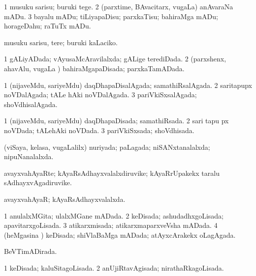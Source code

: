 \bentry
{} 
\gl{\sakirx}
\expl{}
\bmng
\bnum
\num{1} musuku sarisu; buruki tege. 
\num{2} (parxtime, BAvacitarx, \mo vugaLa) anAvaraNa mADu. 
\num{3} bayalu mADu; tiLiyapaDisu; parxkaTisu; bahiraMga mADu; horageDahu; raTuTx mADu. 
\enum
\emng

\noindent
\gl{\akirx}
\expl{}
\bmng
musuku sarisu, tere; buruki kaLaciko. 
\emng
\eentry

\bentry
{} 
\gl{\gu}
\expl{}
\bmng
\bnum
\num{1} gALiyADada; vAyusaMcAravilalxda; gALige terediDada. 
\num{2} (parxshenx, ahavAlu, \mo vugaLa \vi) bahiraMgapaDisada; parxkaTamADada. 
\enum
\emng
\eentry

\bentry
{} 
\gl{\gu}
\expl{}
\bmng
\bnum
\num{1} (nijaveMdu, sariyeMdu) daqDhapaDisalAgada; samathiRsalAgada. 
\num{2} saritapupx noVDalAgada; tALe hAki noVDalAgada. 
\num{3} pariVkiSxsalAgada; shoVdhisalAgada. 
\enum
\emng
\eentry

\bentry
{} 
\gl{\gu}
\expl{}
\bmng
\bnum
\num{1} (nijaveMdu, sariyeMdu) daqDhapaDisada; samathiRsada. 
\num{2} sari tapu px noVDada; tALehAki noVDada. 
\num{3} pariVkiSxsada; shoVdhisada. 
\enum
\emng
\eentry

\bentry
{} 
\gl{\gu}
\expl{}
\bmng
(viSaya, kelasa, \mo vugaLalilx) nuriyada; paLagada; niSANxtanalalxda; nipuNanalalxda. 
\emng
\eentry

\bentry
{} 
\gl{\nA}
\expl{}
\bmng
avayxvahAyaRte; kAyaRsAdhayxvalalxdiruvike; kAyaRrUpakekx taralu sAdhayxvAgadiruvike. 
\emng
\eentry

\bentry
{} 
\gl{\gu}
\expl{}
\bmng
avayxvahAyaR; kAyaRsAdhayxvalalxda. 
\emng
\eentry

\bentry
{} 
\gl{\gu}
\expl{}
\bmng
\bnum
\num{1} anulalxMGita; ulalxMGane mADada. 
\num{2} keDisada; ashudadhxgoLisada; apavitarxgoLisada. 
\num{3} atikarxmisada; atikarxmaparxveVsha mADada. 
\num{4} (heMgasina \vi) keDisada; shiVlaBaMga mADada; atAyxcArakekx oLagAgada. 
\enum
\emng
\eentry

\bentry
{} 
\gl{\gu}
\expl{}
\bmng
BeVTimADirada. 
\emng
\eentry

\bentry
{} 
\gl{\gu}
\expl{}
\bmng
\bnum
\num{1} keDisada; kaluSitagoLisada. 
\num{2} anUjiRtavAgisada; nirathaRkagoLisada. 
\enum
\emng
\eentry

